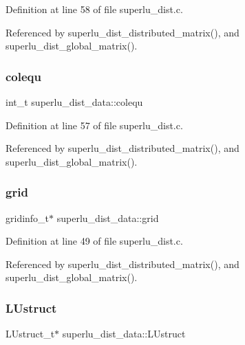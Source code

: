 Definition at line 58 of file superlu\+\_\+dist.\+c.



Referenced by superlu\+\_\+dist\+\_\+distributed\+\_\+matrix(), and superlu\+\_\+dist\+\_\+global\+\_\+matrix().

\mbox{\label{structsuperlu__dist__data_afcd49a61eae2c99435c86aa0d652d3a3}} 
\subsubsection{\texorpdfstring{colequ}{colequ}}
{\footnotesize\ttfamily int\+\_\+t superlu\+\_\+dist\+\_\+data\+::colequ}



Definition at line 57 of file superlu\+\_\+dist.\+c.



Referenced by superlu\+\_\+dist\+\_\+distributed\+\_\+matrix(), and superlu\+\_\+dist\+\_\+global\+\_\+matrix().

\mbox{\label{structsuperlu__dist__data_a4f94d5dfa393e9ac7e9955383a4ecf11}} 
\subsubsection{\texorpdfstring{grid}{grid}}
{\footnotesize\ttfamily gridinfo\+\_\+t$\ast$ superlu\+\_\+dist\+\_\+data\+::grid}



Definition at line 49 of file superlu\+\_\+dist.\+c.



Referenced by superlu\+\_\+dist\+\_\+distributed\+\_\+matrix(), and superlu\+\_\+dist\+\_\+global\+\_\+matrix().

\mbox{\label{structsuperlu__dist__data_af6f100c80c4da3bccebe8d92b478c344}} 
\subsubsection{\texorpdfstring{L\+Ustruct}{LUstruct}}
{\footnotesize\ttfamily L\+Ustruct\+\_\+t$\ast$ superlu\+\_\+dist\+\_\+data\+::\+L\+Ustruct}



